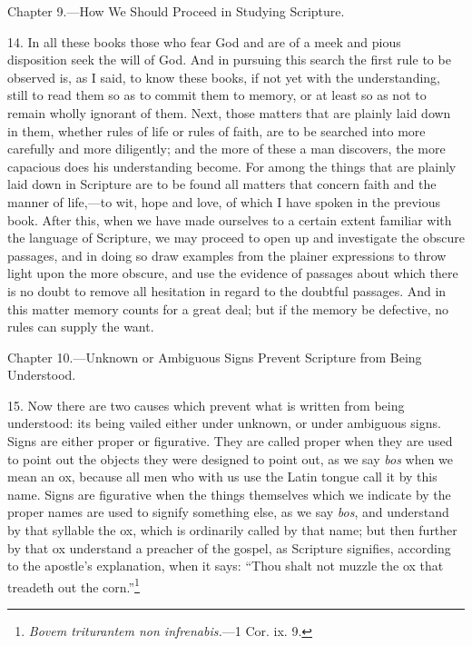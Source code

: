 
Chapter 9.—How We Should Proceed in Studying Scripture.

14. In all these books those who fear God and are of a meek and pious disposition seek the will of God. And in pursuing this search the first rule to be observed is, as I said, to know these books, if not yet with the understanding, still to read them so as to commit them to memory, or at least so as not to remain wholly ignorant of them. Next, those matters that are plainly laid down in them, whether rules of life or rules of faith, are to be searched into more carefully and more diligently; and the more of these a man discovers, the more capacious does his understanding become. For among the things that are plainly laid down in Scripture are to be found all matters that concern faith and the manner of life,—to wit, hope and love, of which I have spoken in the previous book. After this, when we have made ourselves to a certain extent familiar with the language of Scripture, we may proceed to open up and investigate the obscure passages, and in doing so draw examples from the plainer expressions to throw light upon the more obscure, and use the evidence of passages about which there is no doubt to remove all hesitation in regard to the doubtful passages. And in this matter memory counts for a great deal; but if the memory be defective, no rules can supply the want.


Chapter 10.—Unknown or Ambiguous Signs Prevent Scripture from Being Understood.

15. Now there are two causes which prevent what is written from being understood: its being vailed either under unknown, or under ambiguous signs. Signs are either proper or figurative. They are called proper when they are used to point out the objects they were designed to point out, as we say \emph{bos} when we mean an ox, because all men who with us use the Latin tongue call it by this name. Signs are figurative when the things themselves which we indicate by the proper names are used to signify something else, as we say \emph{bos}, and understand by that syllable the ox, which is ordinarily called by that name; but then further by that ox understand a preacher of the gospel, as Scripture signifies, according to the apostle’s explanation, when it says: “Thou shalt not muzzle the ox that treadeth out the corn.”\footnote{\emph{Bovem triturantem non infrenabis.}—1 Cor. ix. 9.}


